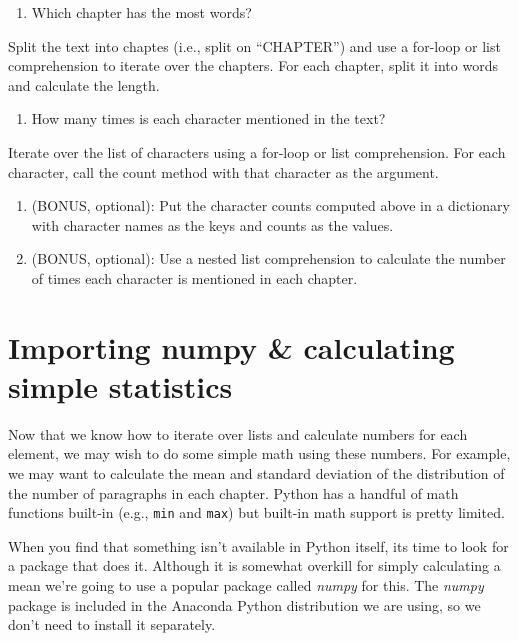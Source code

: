 \documentclass[]{book}
\providecommand{\tightlist}{%
  \setlength{\itemsep}{0pt}\setlength{\parskip}{0pt}}
\begin{document}
\begin{enumerate}
\def\labelenumi{\arabic{enumi}.}
\setcounter{enumi}{1}
\tightlist
\item
  Which chapter has the most words?
\end{enumerate}

Split the text into chaptes (i.e., split on ``CHAPTER'') and use a
for-loop or list comprehension to iterate over the chapters. For each
chapter, split it into words and calculate the length.

\begin{enumerate}
\def\labelenumi{\arabic{enumi}.}
\setcounter{enumi}{2}
\tightlist
\item
  How many times is each character mentioned in the text?
\end{enumerate}

Iterate over the list of characters using a for-loop or list
comprehension. For each character, call the count method with that
character as the argument.

\begin{enumerate}
\def\labelenumi{\arabic{enumi}.}
\setcounter{enumi}{3}
\tightlist
\item
  (BONUS, optional): Put the character counts computed above in a
  dictionary with character names as the keys and counts as the values.
\item
  (BONUS, optional): Use a nested list comprehension to calculate the
  number of times each character is mentioned in each chapter.
\end{enumerate}

\section{Importing numpy \& calculating simple
statistics}\label{importing-numpy-calculating-simple-statistics}

Now that we know how to iterate over lists and calculate numbers for
each element, we may wish to do some simple math using these numbers.
For example, we may want to calculate the mean and standard deviation of
the distribution of the number of paragraphs in each chapter. Python has
a handful of math functions built-in (e.g., \texttt{min} and
\texttt{max}) but built-in math support is pretty limited.

When you find that something isn't available in Python itself, its time
to look for a package that does it. Although it is somewhat overkill for
simply calculating a mean we're going to use a popular package called
\emph{numpy} for this. The \emph{numpy} package is included in the
Anaconda Python distribution we are using, so we don't need to install
it separately.
\end{document}
